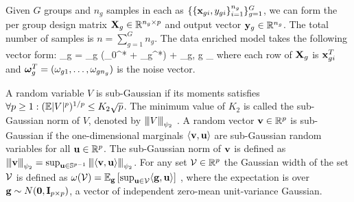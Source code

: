 Given $G$ groups and $n_g$ samples in each as $\{ \{\mathbf{x}_{gi}, y_{gi} \}_{i=1}^{n_g} \}_{g = 1}^G$, we can form the per group design matrix $\mathbf{X}_g \in \mathbb R^{n_g \times p}$ and output vector $\mathbf{y}_g \in \mathbb R ^{n_g}$.
The total number of samples is  $n = \sum_{g = 1}^{G} n_g$.
The data enriched model takes the following vector form:
\be
\label{eq:dirtymodel}
\y_g = \X_g (\bbeta _0^* + \bbeta _g^*) + \oomega_g,  \quad \forall g \in [G]_\setminus
\ee
where each row of $\mathbf{X}_g$ is $\mathbf{x}_{gi}^T$ and $\boldsymbol{\omega}_g^T = (\omega_{g1}, \dots, \omega_{gn_g})$ is the noise vector.

A random variable $V$ is sub-Gaussian if its moments satisfies $\forall p \geq 1: (\mathbb{E} |V|^p )^{1/p} \leq K_2 \sqrt{p}$.
The minimum value of $K_2$ is called the sub-Gaussian  norm of $V$, denoted by ${\left\vert\kern-0.25ex\left\vert\kern-0.25ex\left\vert V \right\vert\kern-0.25ex\right\vert\kern-0.25ex\right\vert}_{\psi_2}$ \cite{vers12}.
A random vector $\mathbf{v} \in \mathbb R^p$ is sub-Gaussian if the one-dimensional marginals $\langle \mathbf{v}, \mathbf{u} \rangle$ are sub-Gaussian random variables for all $\mathbf{u} \in \mathbb R^p$. The sub-Gaussian norm of $\mathbf{v}$ is defined \cite{vers12} as ${\left\vert\kern-0.25ex\left\vert\kern-0.25ex\left\vert \mathbf{v} \right\vert\kern-0.25ex\right\vert\kern-0.25ex\right\vert}_{\psi_2} = \sup_{\mathbf{u} \in \mathbb S^{p-1}} {\left\vert\kern-0.25ex\left\vert\kern-0.25ex\left\vert \langle \mathbf{v}, \mathbf{u} \rangle \right\vert\kern-0.25ex\right\vert\kern-0.25ex\right\vert}_{\psi_2}$.
For any set ${\cal V} \in \mathbb R^p$ the Gaussian width of the set ${\cal V}$ is defined as $\omega({\cal V}) = \mathbb{E}_{\mathbf{g}} \left[ \sup_{\mathbf{u} \in {\cal V}} \langle \mathbf{g}, \mathbf{u} \rangle \right]$ \cite{vershynin2018high}, where the expectation is over $\mathbf{g} \sim N(\mathbf{0}, \mathbf{I}_{p \times p})$, a vector of independent zero-mean unit-variance Gaussian.



